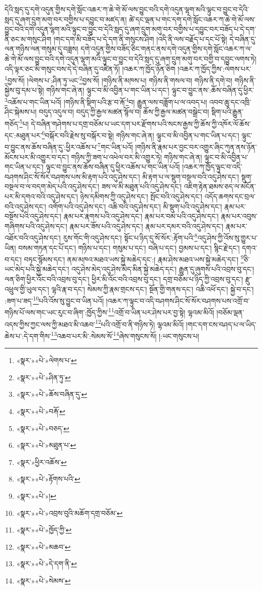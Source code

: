 དེའི་སླད་དུ་དགེ་འདུན་གྱིས་དགེ་སློང་འཆར་ཀ་ཆེ་གེ་མོ་ལས་བྱུང་བའི་དགེ་འདུན་ལྷག་མའི་ལྟུང་བ་བྱུང་བ་དེའི་སླད་དུ་ཞག་དྲུག་མགུ་བར་བགྱིས་པ་དབྱུང་བ་མཛད་ན། ཚེ་དང་ལྡན་པ་གང་དག་དགེ་སློང་འཆར་ཀ་ཆེ་གེ་མོ་ལས་བྱུང་བའི་དགེ་འདུན་ལྷག་མའི་ལྟུང་བ་བྱུང་བ་དེའི་སླད་དུ་ཞག་དྲུག་མགུ་བར་བགྱིས་པ་དབྱུང་བར་བཟོད་པ་དེ་དག་ནི་ཅང་མ་གསུང་ཤིག །གང་དག་མི་བཟོད་པ་དེ་དག་ནི་གསུངས་ཤིག །འདི་ནི་ལས་བརྗོད་པ་དང་པོ་སྟེ། དེ་བཞིན་དུ་ལན་གཉིས་ལན་གསུམ་དུ་བཟླས། དགེ་འདུན་གྱིས་བཟོད་ཅིང་གནང་ནས་དགེ་འདུན་གྱིས་དགེ་སློང་འཆར་ཀ་ལ་ཆེ་གེ་མོ་ལས་བྱུང་བའི་དགེ་འདུན་ལྷག་མའི་ལྟུང་བ་བྱུང་བ་དེའི་སླད་དུ་ཞག་དྲུག་མགུ་བར་བགྱི་བ་དབྱུང་ལགས་ཏེ། འདི་ལྟར་ཅང་མི་གསུང་བས་དེ་དེ་བཞིན་དུ་འཛིན་ཏོ། །འཆར་ཀ་ཁྱོད་ཉོན་ཅིག །འཆར་ཀ་ཁྱོད་ཀྱིས་:ལེགས་པར་\footnote{«སྣར་»«པེ་»ལེགས་པ་}བྱས་སོ། །ལེགས་པ་:ཤིན་ཏུ་ཡང་\footnote{«སྣར་»«པེ་»ཤིན་ཏུ་}བྱས་སོ། །གཉིས་ནི་མཁས་པ། གཉིས་ནི་གསལ་བ། གཉིས་ནི་དགེ་བ། གཉིས་ནི་སྐྱེས་བུ་དམ་པ་སྟེ། གཉིས་གང་ཞེ་ན། ལྟུང་བ་མི་འབྱིན་པ་གང་ཡིན་པ་དང་། ལྟུང་བ་བྱུང་ནས་:ཆོས་བཞིན་དུ་ཕྱིར་\footnote{«སྣར་»«པེ་»ཆོས་བཞིན་དུ་}འཆོས་པ་གང་ཡིན་པའོ། །གཉིས་ནི་སྡིག་པའི་རྩ་བ་རྐོ་\footnote{«སྣར་»«པེ་»བརྐོ་}བ། རྒྱུན་ལས་བཟློག་པ་ལ་འབད་པ། འབབ་ཆུ་དང་འཁྲི་ཤིང་སྐེམས་པ། བདུད་འདུལ་བ། བདུད་ཀྱི་རྒྱལ་མཚན་སྙོལ་བ། ཆོས་ཀྱི་རྒྱལ་མཚན་བསྒྲེང་བ། སྡིག་པའི་རྒྱུན་གཅོད་\footnote{«སྣར་»«པེ་»བཅད་}པ། དེ་བཞིན་གཤེགས་པ་དགྲ་བཅོམ་པ་ཡང་དག་པར་རྫོགས་པའི་སངས་རྒྱས་ཀྱི་ཆོས་ཀྱི་འཁོར་ལོ་ཆོས་དང་:མཐུན་པར་\footnote{«སྣར་»«པེ་»མཐུན་པ་}བསྐོར་བའི་རྗེས་སུ་བསྐོར་བ་སྟེ། གཉིས་གང་ཞེ་ན། ལྟུང་བ་མི་འབྱིན་པ་གང་ཡིན་པ་དང་། ལྟུང་བ་བྱུང་ནས་ཆོས་བཞིན་དུ་:ཕྱིར་འཆོས་པ་\footnote{«སྣར་»ཕྱིར་འཆོས་}གང་ཡིན་པའོ། །གཉིས་ནི་རྣམ་པར་བྱང་བར་འགྱུར་ཞིང་ཀུན་ནས་ཉོན་མོངས་པར་མི་འགྱུར་བ་དང་། གཉིས་ཀྱི་ཟག་པ་འཕེལ་བར་མི་འགྱུར་ཏེ། གཉིས་གང་ཞེ་ན། ལྟུང་བ་མི་འབྱིན་པ་གང་ཡིན་པ་དང་། ལྟུང་བ་བྱུང་ནས་ཆོས་བཞིན་དུ་ཕྱིར་འཆོས་པ་གང་ཡིན་པའོ། །འཆར་ཀ་ཁྱོད་ལྟུང་བ་འདི་བཤགས་ཤིང་སོ་སོར་བཤགས་པས་མི་རྟག་པའི་འདུ་ཤེས་དང་། མི་རྟག་པ་ལ་སྡུག་བསྔལ་བའི་འདུ་ཤེས་དང་། སྡུག་བསྔལ་བ་ལ་བདག་མེད་པའི་འདུ་ཤེས་དང་། ཟས་ལ་མི་མཐུན་པའི་འདུ་ཤེས་དང་། འཇིག་རྟེན་ཐམས་ཅད་ལ་མངོན་པར་མི་དགའ་བའི་འདུ་ཤེས་དང་། ཉེས་དམིགས་ཀྱི་འདུ་ཤེས་དང་། སྤོང་བའི་འདུ་ཤེས་དང་། འདོད་ཆགས་དང་བྲལ་བའི་འདུ་ཤེས་དང་། འགོག་པའི་འདུ་ཤེས་དང་། འཆི་བའི་འདུ་ཤེས་དང་། མི་སྡུག་པའི་འདུ་ཤེས་དང་། རྣམ་པར་བསྔོས་པའི་འདུ་ཤེས་དང་། རྣམ་པར་རྣགས་པའི་འདུ་ཤེས་དང་། རྣམ་པར་བམ་པའི་འདུ་ཤེས་དང་། རྣམ་པར་འབུས་གཞིགས་པའི་འདུ་ཤེས་དང་། རྣམ་པར་ཟོས་པའི་འདུ་ཤེས་དང་། རྣམ་པར་དམར་བའི་འདུ་ཤེས་དང་། རྣམ་པར་འཐོར་བའི་འདུ་ཤེས་དང་། རུས་གོང་གི་འདུ་ཤེས་དང་། སྟོང་པ་ཉིད་དུ་སོ་སོར་:རྟོག་པའི་\footnote{«སྣར་»«པེ་»རྟོགས་པའི་}འདུ་ཤེས་ཀྱི་འོས་སུ་གྱུར་པ་ཡིན། བསམ་གཏན་དང་པོ་དང་། གཉིས་པ་དང་། གསུམ་པ་དང་། བཞི་པ་དང་། བྱམས་པ་དང་། སྙིང་རྗེ་དང་། དགའ་བ་དང་། བཏང་སྙོམས་དང་། ནམ་མཁའ་མཐའ་ཡས་སྐྱེ་མཆེད་དང་:། རྣམ་ཤེས་མཐའ་ཡས་སྐྱེ་མཆེད་དང་། \footnote{«སྣར་»«པེ་»།  }ཅི་ཡང་མེད་པའི་སྐྱེ་མཆེད་དང་། འདུ་ཤེས་མེད་འདུ་ཤེས་མེད་མིན་སྐྱེ་མཆེད་དང་། རྒྱུན་དུ་ཞུགས་པའི་འབྲས་བུ་དང་། ལན་ཅིག་ཕྱིར་འོང་བའི་འབྲས་བུ་དང་། ཕྱིར་མི་འོང་བའི་འབྲས་བུ་དང་། དགྲ་བཅོམ་པ་ཉིད་ཀྱི་འབྲས་བུ་དང་། རྫུ་འཕྲུལ་གྱི་ཡུལ་དང་། ལྷའི་རྣ་བ་དང་། སེམས་ཀྱི་རྣམ་གྲངས་དང་། སྔོན་གྱི་གནས་དང་། འཆི་འཕོ་དང་། སྐྱེ་བ་དང་། :ཟག་པ་ཟད་\footnote{«སྣར་»«པེ་»འབྲས་བུའི་མཆོག་དགྲ་བཅོམ་}པའི་འོས་སུ་བྱུང་བ་ཡིན་པའོ། །འཆར་ཀ་ལྟུང་བ་འདི་བཤགས་ཤིང་སོ་སོར་བཤགས་པས་འགྲོ་བ་གཉིས་པོ་ལས་གང་ཡང་རུང་བ་ཞིག་:ཁྱོད་ཀྱིས་\footnote{«སྣར་»«པེ་»ཁྱོད་ཀྱི་}འགྲོ་བ་ཡིན་པར་ཤེས་པར་བྱ་སྟེ། ལྷའམ་མིའོ། །བཅོམ་ལྡན་འདས་ཀྱིས་ཀྱང་ལས་ཀྱི་མཐའ་མི་འཆབ་\footnote{«སྣར་»«པེ་»མཆབ་}པའི་འགྲོ་བ་ནི་གཉིས་ཏེ། ལྷའམ་མིའོ། །གང་དག་ངས་བཤད་པ་ལ་ཡིད་ཆེས་པ་:དེ་དག་གིས་\footnote{«སྣར་»«པེ་»དེ་དག་ནི་}འཆབ་པར་མི་:སེམས་སོ་\footnote{«སྣར་»«པེ་»སེམས་}ཞེས་གསུངས་སོ། །:ཡང་གསུངས་པ། 